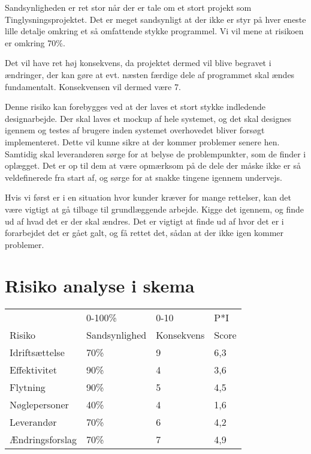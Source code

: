 \documentclass[10pt,a4paper,danish]{article}
\begin{document}
Sandsynligheden er ret stor når der er tale om et stort projekt som Tinglysningsprojektet. Det er meget sandsynligt at der ikke er styr på hver eneste lille detalje omkring et så omfattende stykke programmel. Vi vil mene at risikoen er omkring 70\%.

Det vil have ret høj konsekvens, da projektet dermed vil blive begravet i ændringer, der kan gøre at evt. næsten færdige dele af programmet skal ændes fundamentalt. Konsekvensen vil dermed være 7.

Denne risiko kan forebygges ved at der laves et stort stykke indledende designarbejde. Der skal laves et mockup af hele systemet, og det skal designes igennem og testes af brugere inden systemet overhovedet bliver forsøgt implementeret. Dette vil kunne sikre at der kommer problemer senere hen. Samtidig skal leverandøren sørge for at belyse de problempunkter, som de finder i oplægget. Det er op til dem at være opmærksom på de dele der måske ikke er så veldefinerede fra start af, og sørge for at snakke tingene igennem undervejs.

Hvis vi først er i en situation hvor kunder kræver for mange rettelser, kan det være vigtigt at gå tilbage til grundlæggende arbejde. Kigge det igennem, og finde ud af hvad det er der skal ændres. Det er vigtigt at finde ud af hvor det er i forarbejdet det er gået galt, og få rettet det, sådan at der ikke igen kommer problemer.

\section{Risiko analyse i skema}
\begin{tabular}{l|l|l|l}
           & 0-100\%       & 0-10       & P*I   \\
Risiko     & Sandsynlighed & Konsekvens & Score \\\hline
Idriftsættelse & 70\% & 9 & 6,3 \\
Effektivitet   & 90\% & 4 & 3,6 \\
Flytning   & 90\% & 5 & 4,5 \\
Nøglepersoner & 40\% & 4 & 1,6 \\
Leverandør & 70\% & 6 & 4,2\\
Ændringsforslag & 70\% & 7 & 4,9 \\
\end{tabular}
\end{document}
